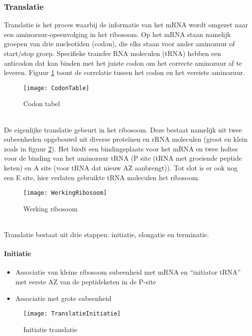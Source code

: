 \documentclass[a4paper,kul]{kulakarticle} %
\begin{document}
\subsubsection{Translatie}
Translatie is het proces waarbij de informatie van het mRNA wordt omgezet naar een aminozuur-opeenvolging in het ribosoom. Op het mRNA staan namelijk groepen van drie nucleotiden (codon), die elks staan voor ander aminozuur of start/stop groep. Specifieke transfer RNA moleculen (tRNA) hebben een anticodon dat kan binden met het juiste codon om het correcte aminozuur af te leveren. Figuur \ref{fig:codontable} toont de correlatie tussen het codon en het vereiste aminozuur.
\begin{figure}[h]
	\centering
	\texttt{[image: CodonTable]}
	\caption[Codon Tabel]{Codon tabel}
	\label{fig:codontable}
\end{figure}\\
De eigenlijke translatie gebeurt in het ribosoom. Deze bestaat namelijk uit twee subeenheden opgebouwd uit diverse proteïnen en rRNA moleculen (groot en klein zoals in figuur \ref{fig:werkingribosoom}). Het biedt een bindingsplaats voor het mRNA en twee holtes voor de binding van het aminozuur tRNA (P site (tRNA met groeiende peptide keten) en A site (voor tRNA dat nieuw AZ aanbrengt)). Tot slot is er ook nog een E site, hier verlaten gebruikte tRNA moleculen het ribosoom. 
\begin{figure}[h]
	\centering
	\texttt{[image: WerkingRibosoom]}
	\caption[Werking ribosoom]{Werking ribosoom}
	\label{fig:werkingribosoom}
\end{figure}\\
\newpage
Translatie bestaat uit drie stappen: initiatie, elongatie en terminatie. 
\paragraph{Initiatie}
\begin{itemize}
	\item Associatie van kleine ribosoom subeenheid met mRNA en “initiator tRNA” met eerste AZ van de peptideketen in de P-site
	\item Associatie met grote subeenheid
\end{itemize}
\begin{figure}[h]
	\centering
	\texttt{[image: TranslatieInitiatie]}
	\caption[Initiatie translatie]{Initiatie translatie}
	\label{fig:translatieinitiatie}
\end{figure}
\newpage
\end{document}
